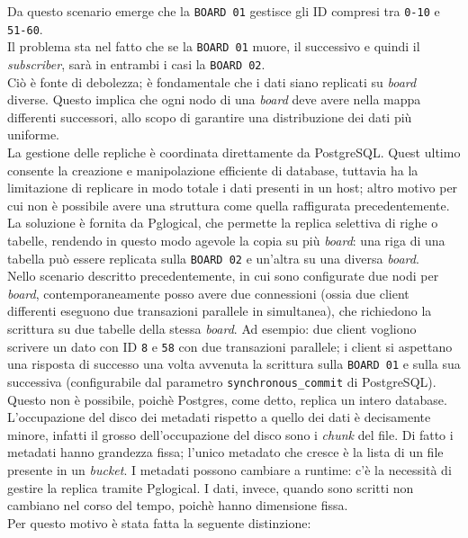 Da questo scenario emerge che la \verb"BOARD 01" gestisce gli ID compresi tra \verb"0-10" e \verb"51-60".\\
Il problema sta nel fatto che se la \verb"BOARD 01" muore, il successivo e quindi il \textit{subscriber}, sar\`{a} in entrambi i casi la \verb"BOARD 02".\\
Ci\`{o} \`{e} fonte di debolezza; \`{e} fondamentale che i dati siano replicati su \textit{board} diverse. Questo implica che ogni nodo di una \textit{board} deve avere nella mappa differenti successori, allo scopo di garantire una distribuzione dei dati pi\`{u} uniforme.\\
La gestione delle repliche \`{e} coordinata direttamente da PostgreSQL.
Quest ultimo consente la creazione e manipolazione efficiente di database, tuttavia ha la limitazione di replicare in modo totale i dati presenti in un host; altro motivo per cui non \`{e} possibile avere una struttura come quella raffigurata precedentemente.\\
La soluzione \`{e} fornita da Pglogical, che permette la replica selettiva di righe o tabelle, rendendo in questo modo agevole la copia su pi\`{u} \textit{board}: una riga di una tabella pu\`{o} essere replicata sulla \verb"BOARD 02" e un'altra su una diversa \textit{board}.\\
Nello scenario descritto precedentemente, in cui sono configurate due nodi per \textit{board}, contemporaneamente posso avere due connessioni (ossia due client differenti eseguono due transazioni parallele in simultanea), che richiedono la scrittura su due tabelle della stessa \textit{board}. Ad esempio: due client vogliono scrivere un dato con ID \verb"8" e \verb"58" con due transazioni parallele; i client si aspettano una risposta di successo una volta avvenuta la scrittura sulla \verb"BOARD 01" e sulla sua successiva (configurabile dal parametro \verb"synchronous_commit" di PostgreSQL). Questo non \`{e} possibile, poich\`{e} Postgres, come detto, replica un intero database.
L'occupazione del disco dei metadati rispetto a quello dei dati \`{e} decisamente minore, infatti il grosso dell'occupazione del disco sono i \textit{chunk} del file. Di fatto i metadati hanno grandezza fissa; l'unico metadato che cresce \`{e} la lista di un file presente in un \textit{bucket}. I metadati possono cambiare a runtime: c'\`{e} la necessit\`{a} di gestire la replica tramite Pglogical.
I dati, invece, quando sono scritti non cambiano nel corso del tempo, poich\`{e} hanno dimensione fissa. \\
Per questo motivo \`{e} stata fatta la seguente distinzione:

